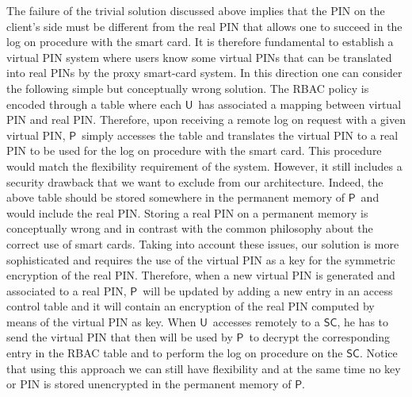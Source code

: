 \documentclass[runningheads]{llncs}
\newcommand{\User}{\ensuremath{\mathsf{U}}}
\newcommand{\Proxy}{\ensuremath{\mathsf{P}}}
\newcommand{\SC}{\ensuremath{\mathsf{SC}}}
\begin{document}
The failure of the trivial solution discussed above implies that the PIN on the client's side must be different from the real PIN that allows one to succeed in the log on procedure with the smart card. It is therefore fundamental to establish a virtual PIN system where users know some virtual PINs that can be translated into real PINs by the proxy smart-card system. In this direction one can consider the following simple but conceptually wrong solution. The RBAC policy is encoded through a table where each \User\ has associated a mapping between virtual PIN and real PIN. Therefore, upon receiving a remote log on request with a given virtual PIN, \Proxy\  simply accesses the table and translates the virtual PIN to a real PIN to be used for the log on procedure with the smart card. This procedure would match the flexibility requirement of the system. However, it still includes a security drawback that we want to exclude from our architecture. Indeed, the above table should be stored somewhere in the permanent memory of \Proxy\ and would include the real PIN. Storing a real PIN on a permanent memory is conceptually wrong and in contrast with the common philosophy about the correct use of smart cards.  Taking into account these issues, our solution is more sophisticated and requires the use of the virtual PIN as a key for the symmetric encryption of the real PIN. Therefore, when a new virtual PIN is generated and associated to a real PIN, \Proxy\ will be updated by adding a new entry in an access control table and it will contain an encryption of the real PIN computed by means of the virtual PIN as key. When \User\ accesses remotely to a \SC , he has to send the virtual PIN that then will be used by \Proxy\ to decrypt the corresponding entry in the RBAC table and to perform the log on procedure on the \SC . Notice that using this approach we can still have flexibility and at the same time no key or PIN is stored unencrypted in the permanent memory of \Proxy.
\end{document}
